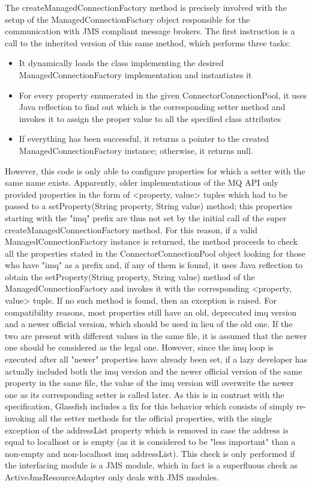 The createManagedConnectionFactory method is precisely involved with the setup of the ManagedConnectionFactory object responsible for the communication with JMS compliant message brokers. The first instruction is a call to the inherited version of this same method, which performs three tasks:
\begin{itemize}
	\item It dynamically loads the class implementing the desired ManagedConnectionFactory implementation and instantiates it
	\item For every property enumerated in the given ConnectorConnectionPool, it uses Java reflection to find out which is the corresponding setter method and invokes it to assign the proper value to all the specified class attributes
	\item If everything has been successful, it returns a pointer to the created ManagedConnectionFactory instance; otherwise, it returns null.
\end{itemize}
However, this code is only able to configure properties for which a setter with the same name exists. Apparently, older implementations of the MQ API only provided properties in the form of <property, value> tuples which had to be passed to a setProperty(String property, String value) method; this properties starting with the "imq" prefix are thus not set by the initial call of the super createManagedConnectionFactory method. 
For this reason, if a valid ManagedConnectionFactory instance is returned, the method proceeds to check all the properties stated in the ConnectorConnectionPool object looking for those who have "imq" as a prefix and, if any of them is found, it uses Java reflection to obtain the setProperty(String property, String value) method of the ManagedConnectionFactory and invokes it with the corresponding <property, value> tuple. If no such method is found, then an exception is raised. 
For compatibility reasons, most properties still have an old, deprecated imq version and a newer official version, which should be used in lieu of the old one. If the two are present with different values in the same file, it is assumed that the newer one should be considered as the legal one. 
However, since the imq loop is executed after all "newer" properties have already been set, if a lazy developer has actually included both the imq version and the newer official version of the same property in the same file, the value of the imq version will overwrite the newer one as its corresponding setter is called later. 
As this is in contrast with the specification, Glassfish includes a fix for this behavior which consists of simply re-invoking all the setter methods for the official properties, with the single exception of the addressList property which is removed in case the address is equal to localhost or is empty (as it is considered to be "less important" than a non-empty and non-localhost imq addressList). This check is only performed if the interfacing module is a JMS module, which in fact is a superfluous check as ActiveJmsResourceAdapter only deals with JMS modules. 

